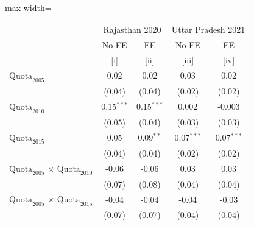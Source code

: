 
\begingroup
\centering
\scriptsize
\begin{adjustbox}{max width=\linewidth}
   \begin{threeparttable}[b]
      \begin{tabular}{lcccc}
         \toprule
          & \multicolumn{2}{c}{Rajasthan 2020} & \multicolumn{2}{c}{Uttar Pradesh 2021} \\ 
                                                                                                  & No FE        & FE            & No FE        & FE \\   
                                                                                                  & [i]          & [ii]          & [iii]        & [iv]\\  
         \midrule 
         $\text{Quota}_{2005}$                                                                    & 0.02         & 0.02          & 0.03         & 0.02\\   
                                                                                                  & (0.04)       & (0.04)        & (0.02)       & (0.02)\\   
         $\text{Quota}_{2010}$                                                                    & 0.15$^{***}$ & 0.15$^{***}$  & 0.002        & -0.003\\   
                                                                                                  & (0.05)       & (0.04)        & (0.03)       & (0.03)\\   
         $\text{Quota}_{2015}$                                                                    & 0.05         & 0.09$^{**}$   & 0.07$^{***}$ & 0.07$^{***}$\\   
                                                                                                  & (0.04)       & (0.04)        & (0.02)       & (0.02)\\   
         $\text{Quota}_{2005}$ $\times$ $\text{Quota}_{2010}$                                     & -0.06        & -0.06         & 0.03         & 0.03\\   
                                                                                                  & (0.07)       & (0.08)        & (0.04)       & (0.04)\\   
         $\text{Quota}_{2005}$ $\times$ $\text{Quota}_{2015}$                                     & -0.04        & -0.04         & -0.04        & -0.03\\   
                                                                                                  & (0.07)       & (0.07)        & (0.04)       & (0.04)\\   

\end{tabular}
\end{threeparttable}
\end{adjustbox}
